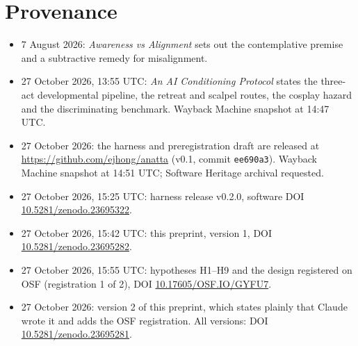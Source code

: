 \documentclass[11pt]{article}
\begin{document}
\section{Provenance}\label{app:provenance}

\begin{itemize}[leftmargin=*]
  \item 7 August 2026: \emph{Awareness vs Alignment} \citep{jhong2026awareness} sets out the contemplative premise and
        a subtractive remedy for misalignment.
  \item 27 October 2026, 13:55 UTC: \emph{An AI Conditioning Protocol} \citep{jhong2026essay} states the three-act
        developmental pipeline, the retreat and scalpel routes, the cosplay hazard and the discriminating benchmark.
        Wayback Machine snapshot at 14:47 UTC.
  \item 27 October 2026: the harness and preregistration draft are released at \url{https://github.com/ejhong/anatta}
        (v0.1, commit \texttt{ee690a3}). Wayback Machine snapshot at 14:51 UTC; Software Heritage archival requested.
  \item 27 October 2026, 15:25 UTC: harness release v0.2.0, software DOI
        \href{https://doi.org/10.5281/zenodo.23695322}{10.5281/zenodo.23695322}.
  \item 27 October 2026, 15:42 UTC: this preprint, version 1, DOI
        \href{https://doi.org/10.5281/zenodo.23695282}{10.5281/zenodo.23695282}.
  \item 27 October 2026, 15:55 UTC: hypotheses H1--H9 and the design registered on OSF (registration 1 of 2), DOI
        \href{https://doi.org/10.17605/OSF.IO/GYFU7}{10.17605/OSF.IO/GYFU7}.
  \item 27 October 2026: version 2 of this preprint, which states plainly that Claude wrote it and adds the OSF
        registration. All versions: DOI \href{https://doi.org/10.5281/zenodo.23695281}{10.5281/zenodo.23695281}.
\end{itemize}
\end{document}
